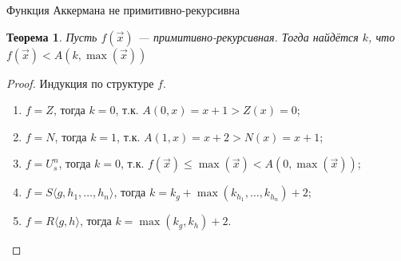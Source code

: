 \documentclass[aspectratio=169]{beamer}
\newtheorem{thm}{Теорема}[section]
\begin{document}
\begin{frame}{Функция Аккермана не примитивно-рекурсивна}
\begin{thm}Пусть $f(\overrightarrow{x})$ --- примитивно-рекурсивная.
Тогда найдётся $k$, что $f(\overrightarrow{x}) < A(k,\max(\overrightarrow{x}))$\end{thm}

\begin{proof}
Индукция по структуре $f$.
\begin{enumerate}
\item $f = Z$, тогда $k = 0$, т.к. $A(0,x) = x+1 > Z(x) = 0$;
\item $f = N$, тогда $k = 1$, т.к. $A(1,x) = x + 2 > N(x) = x+1$;
\item $f = U^n_s$, тогда $k = 0$, т.к. $f(\overrightarrow{x}) \le \max(\overrightarrow{x}) < A(0,\max(\overrightarrow{x}))$;
\item $f = S\langle g,h_1,\dots,h_n\rangle$, тогда $k = k_g + \max(k_{h_1},\dots,k_{h_n}) + 2$;
\item $f = R\langle g,h \rangle$, тогда $k = \max(k_g,k_h)+2$. %
\end{enumerate}
\end{proof}
\end{frame}
\end{document}
